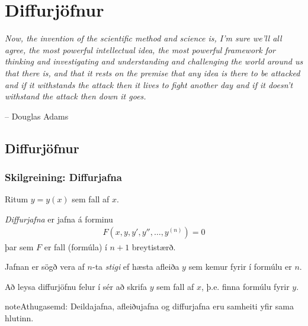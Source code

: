 \documentclass[b5paper,11pt,icelandic]{sphinxmanual}
\begin{document}
\chapter{Diffurjöfnur}
\label{kafli08:diffurjofnur}\label{kafli08::doc}
\emph{Now, the invention of the scientific method and science is, I'm sure
we'll all agree, the most powerful intellectual idea, the most powerful
framework for thinking and investigating and understanding and challenging
the world around us that there is, and that it rests on the premise that
any idea is there to be attacked and if it withstands the attack then it
lives to fight another day and if it doesn't withstand the attack then
down it goes.}

-- Douglas Adams


\section{Diffurjöfnur}
\label{kafli08:index-0}\label{kafli08:id1}

\subsection{Skilgreining: Diffurjafna}
\label{kafli08:skilgreining-diffurjafna}\label{kafli08:diffurjafna}
Ritum \(y=y(x)\) sem fall af \(x\).

\textit{Diffurjafna} er jafna á forminu
\begin{equation*}
\begin{split}F(x, y, y', y'', \ldots, y^{(n)})=0\end{split}
\end{equation*}
þar sem \(F\) er fall (formúla) í \(n+1\) breytistærð.

Jafnan er sögð vera af \(n\)-ta \emph{stigi} ef hæsta afleiða \(y\)
sem kemur fyrir í formúlu er \(n\).

Að leysa diffurjöfnu felur í sér að skrifa \(y\) sem fall
af \(x\), þ.e. finna formúlu fyrir \(y\).

\begin{notice}{note}{Athugasemd:}
Deildajafna, afleiðujafna og diffurjafna eru samheiti yfir
sama hlutinn.
\end{notice}
\end{document}
